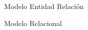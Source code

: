 \begin{section}{Modelo Entidad Relaci\'on}
\begin{subsection}{Modelo Relacional}

\end{subsection}

\end{section}
